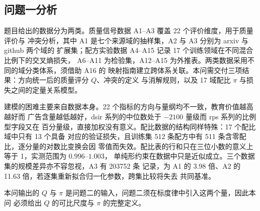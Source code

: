 \documentclass[bwprint]{gmcmthesis}
\numberwithin{equation}{section}
\numberwithin{figure}{section}
\numberwithin{table}{section}
\begin{document}
%
%
\subsection{问题一分析}

题目给出的数据分为两类。质量信号数据 A1--A3 覆盖 22 个评价维度，用于质量评价与
冲突分析，其中 A1 是七个来源域的抽样集，A2 与 A3 分别为 arxiv 与 github 两个域的
扩展集；配方实验数据 A4--A15 记录 17 个训练领域在不同混合比例下的交叉熵损失，
A6--A11 为检验集，A12--A15 为外推表。两类数据采用不同的域分类体系，须借助 A16 的
映射指南建立跨体系关联。本问需交付三项结果：方向统一后的质量评分 $Q$、冲突的定义
与消解规则，以及 17 域配比 $\pi$ 与损失之间的定量关系模型。

建模的困难主要来自数据本身。22 个指标的方向与量纲均不一致，教育价值越高越好而
广告含量越低越好，dsir 系列的中位数处于 $-2100$ 量级而 rps 系列的比例型字段又在
百分量级，直接加权没有意义。配比数据的结构同样特殊：17 个配比域中只有 13 个具备
对应的验证损失，且训练集 512 条配方中有 511 条含零配比，逐分量的对数比变换会因
零值而失效。配比表的行和只在三位小数的意义上等于 1，实测范围为 $0.996$--$1.003$，
单纯形约束在数据中只是近似成立。三个数据集的规模差异亦不容忽视，A3 有 203752 条
记录，为 A1 的 3.98 倍、A2 的 11.63 倍，若逐集重新拟合归一化参数，跨集比较将失去
共同基准。

本问输出的 $Q$ 与 $\pi$ 是问题二的输入，问题二须在标度律中引入这两个量，因此本问
必须给出 $Q$ 的可比尺度与 $\pi$ 的完整定义。
\end{document}
